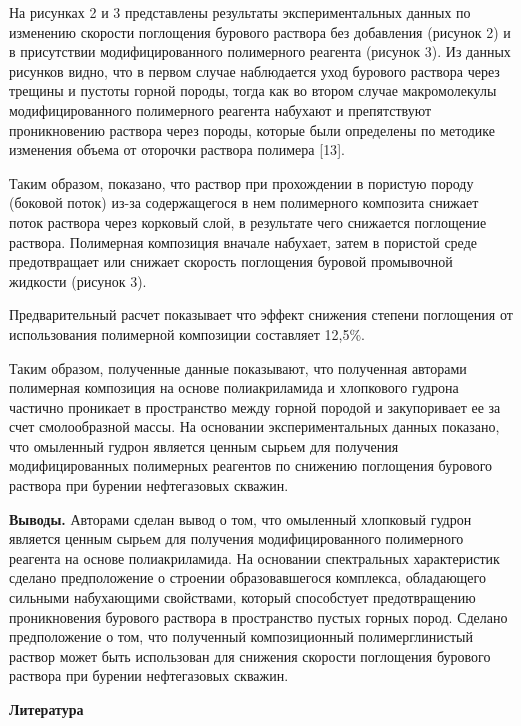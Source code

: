 \begin{multicols}{2}
На рисунках 2 и 3 представлены результаты экспериментальных данных по
изменению скорости поглощения бурового раствора без добавления (рисунок
2) и в присутствии модифицированного полимерного реагента (рисунок 3).
Из данных рисунков видно, что в первом случае наблюдается уход бурового
раствора через трещины и пустоты горной породы, тогда как во втором
случае макромолекулы модифицированного полимерного реагента набухают и
препятствуют проникновению раствора через породы, которые были
определены по методике изменения объема от оторочки раствора полимера
{[}13{]}.~

Таким образом, показано, что раствор при прохождении в пористую породу
(боковой поток) из-за содержащегося в нем полимерного композита снижает
поток раствора через корковый слой, в результате чего снижается
поглощение раствора. Полимерная композиция вначале набухает, затем в
пористой среде предотвращает или снижает скорость поглощения буровой
промывочной жидкости (рисунок 3).

Предварительный расчет показывает что эффект снижения степени поглощения
от использования полимерной композиции составляет 12,5\%.

Таким образом, полученные данные показывают, что полученная авторами
полимерная композиция на основе полиакриламида и хлопкового гудрона
частично проникает в пространство между горной породой и закупоривает ее
за счет смолообразной массы. На основании экспериментальных данных
показано, что омыленный гудрон является ценным сырьем для получения
модифицированных полимерных реагентов по снижению поглощения бурового
раствора при бурении нефтегазовых скважин.

{\bfseries Выводы.} Авторами сделан вывод о том, что омыленный хлопковый
гудрон является ценным сырьем для получения модифицированного
полимерного реагента на основе полиакриламида. На основании спектральных
характеристик сделано предположение о строении образовавшегося
комплекса, обладающего сильными набухающими свойствами, который
способстует предотвращению проникновения бурового раствора в
пространство пустых горных пород. Сделано предположение о том, что
полученный композиционный полимерглинистый раствор может быть
использован для снижения скорости поглощения бурового раствора при
бурении нефтегазовых скважин.
\end{multicols}

\begin{center}
{\bfseries Литература}
\end{center}

